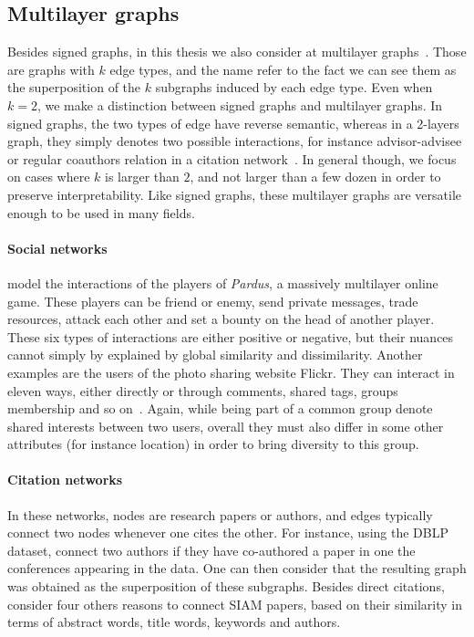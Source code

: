 

\subsection{Multilayer graphs}
\label{sub:intro_multilayer_graphs}

Besides signed graphs, in this thesis we also consider at multilayer
graphs~\autocites{Kivela2014}{multiSurvey14}. Those are graphs with $k$ edge types, and the name
refer to the fact we can see them as the superposition of the $k$ subgraphs induced by each edge
type. Even when $k=2$, we make a distinction between signed graphs and multilayer graphs. In signed
graphs, the two types of edge have reverse semantic, whereas in a 2-layers graph, they simply
denotes two possible interactions, for instance advisor-advisee or regular coauthors relation in a
citation network~\autocite{Advisor10}. In general though, we focus on cases where $k$ is larger than
$2$, and not larger than a few dozen in order to preserve interpretability.
Like signed graphs, these multilayer graphs are versatile enough to be used in many fields.

\paragraph{Social networks} \Textcite{Szell2010} model the interactions of the players of
\emph{Pardus}, a massively multilayer online game. These players can be friend or enemy, send
private messages, trade resources, attack each other and set a bounty on the head of another
player. These six types of interactions are either positive or negative, but their nuances cannot
simply by explained by global similarity and dissimilarity. Another examples are the users of the
photo sharing website Flickr.  They can interact in eleven ways, either directly or through
comments, shared tags, groups membership and so on~\autocite{RecoFlickrMulti11}. Again, while being
part of a common group denote shared interests between two users, overall they must also differ in
some other attributes (for instance location) in order to bring diversity to this group.

\paragraph{Citation networks} In these networks, nodes are research papers or authors, and edges
typically connect two nodes whenever one cites the other. For instance, using the DBLP dataset,
\textcite{communityDBLPbyConf05} connect two authors if they have co-authored a paper in one the
 conferences appearing in the data. One can then consider that the resulting graph was
obtained as the superposition of these  subgraphs. Besides direct citations,
\textcite{articlesMultiSim11} consider four others reasons to connect  SIAM papers, based
on their similarity in terms of abstract words, title words, keywords and authors.

